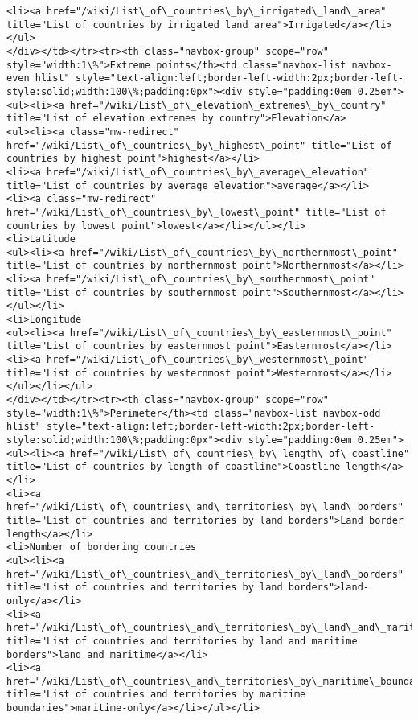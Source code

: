 \documentclass[11pt]{article}
\begin{document}
\begin{Verbatim}[commandchars=\\\{\}]
<li><a href="/wiki/List\_of\_countries\_by\_irrigated\_land\_area" title="List of countries by irrigated land area">Irrigated</a></li></ul>
</div></td></tr><tr><th class="navbox-group" scope="row" style="width:1\%">Extreme points</th><td class="navbox-list navbox-even hlist" style="text-align:left;border-left-width:2px;border-left-style:solid;width:100\%;padding:0px"><div style="padding:0em 0.25em">
<ul><li><a href="/wiki/List\_of\_elevation\_extremes\_by\_country" title="List of elevation extremes by country">Elevation</a>
<ul><li><a class="mw-redirect" href="/wiki/List\_of\_countries\_by\_highest\_point" title="List of countries by highest point">highest</a></li>
<li><a href="/wiki/List\_of\_countries\_by\_average\_elevation" title="List of countries by average elevation">average</a></li>
<li><a class="mw-redirect" href="/wiki/List\_of\_countries\_by\_lowest\_point" title="List of countries by lowest point">lowest</a></li></ul></li>
<li>Latitude
<ul><li><a href="/wiki/List\_of\_countries\_by\_northernmost\_point" title="List of countries by northernmost point">Northernmost</a></li>
<li><a href="/wiki/List\_of\_countries\_by\_southernmost\_point" title="List of countries by southernmost point">Southernmost</a></li></ul></li>
<li>Longitude
<ul><li><a href="/wiki/List\_of\_countries\_by\_easternmost\_point" title="List of countries by easternmost point">Easternmost</a></li>
<li><a href="/wiki/List\_of\_countries\_by\_westernmost\_point" title="List of countries by westernmost point">Westernmost</a></li></ul></li></ul>
</div></td></tr><tr><th class="navbox-group" scope="row" style="width:1\%">Perimeter</th><td class="navbox-list navbox-odd hlist" style="text-align:left;border-left-width:2px;border-left-style:solid;width:100\%;padding:0px"><div style="padding:0em 0.25em">
<ul><li><a href="/wiki/List\_of\_countries\_by\_length\_of\_coastline" title="List of countries by length of coastline">Coastline length</a></li>
<li><a href="/wiki/List\_of\_countries\_and\_territories\_by\_land\_borders" title="List of countries and territories by land borders">Land border length</a></li>
<li>Number of bordering countries
<ul><li><a href="/wiki/List\_of\_countries\_and\_territories\_by\_land\_borders" title="List of countries and territories by land borders">land-only</a></li>
<li><a href="/wiki/List\_of\_countries\_and\_territories\_by\_land\_and\_maritime\_borders" title="List of countries and territories by land and maritime borders">land and maritime</a></li>
<li><a href="/wiki/List\_of\_countries\_and\_territories\_by\_maritime\_boundaries" title="List of countries and territories by maritime boundaries">maritime-only</a></li></ul></li>

\end{Verbatim}
\end{document}
